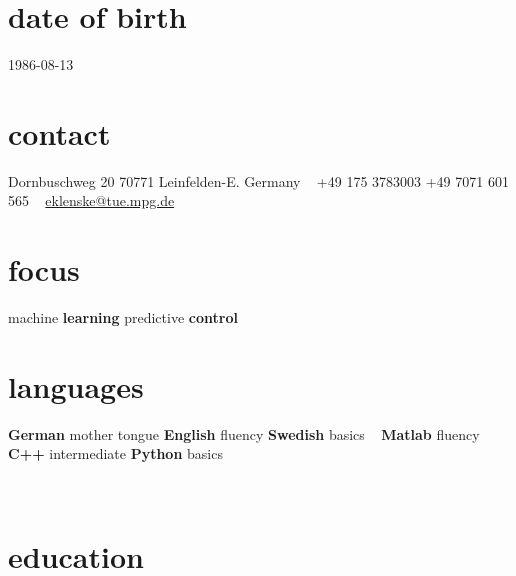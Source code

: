 \documentclass[a4paper]{k-cv} %
\begin{document}


\begin{aside} %
\section{date of birth}
\color{gray}1986-08-13
\section{contact}
\color{headercolor}Dornbuschweg 20
70771 Leinfelden-E.
Germany
~
+49 175 3783003
+49 7071 601 565
~
\href{mailto:eklenske@tue.mpg.de}{eklenske@tue.mpg.de}
\section{focus}
machine {\bfseries learning}
predictive {\bfseries control}
\section{languages}
{\bfseries German} mother tongue
{\bfseries English} fluency
{\bfseries Swedish} basics
~
{\bfseries Matlab} fluency
{\bfseries C++} intermediate
{\bfseries Python} basics
\end{aside}

\
\section{education}\normalfont
\end{document}
